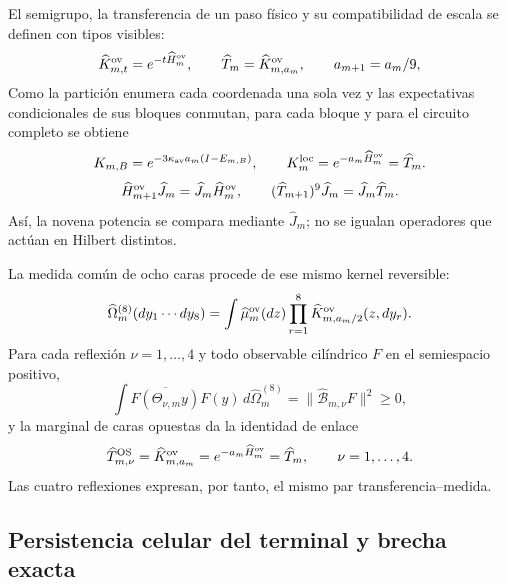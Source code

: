 El semigrupo, la transferencia de un paso físico y su compatibilidad de
escala se definen con tipos visibles:
\begin{equation}\label{eq:realizaciones-ym-semigrupo}
 \widehat K_{m,t}^{\rm ov}=e^{-t\widehat H_m^{\rm ov}},
 \qquad
 \widehat T_m=\widehat K_{m,a_m}^{\rm ov},
 \qquad a_{m+1}=a_m/9,
\end{equation}
Como la partición enumera cada coordenada una sola vez y las expectativas
condicionales de sus bloques conmutan, para cada bloque y para el circuito
completo se obtiene
\begin{equation}\label{eq:realizaciones-ym-circuito-semigrupo}
 K_{m,B}=e^{-3\kappa_{\rm av}a_m(I-E_{m,B})},
 \qquad
 K_m^{\rm loc}=e^{-a_m\widehat H_m^{\rm ov}}=\widehat T_m.
\end{equation}
\begin{equation}\label{eq:realizaciones-ym-semigrupo-entrelazado}
 \widehat H_{m+1}^{\rm ov}\widehat J_m
 =\widehat J_m\widehat H_m^{\rm ov},
 \qquad
 (\widehat T_{m+1})^9\widehat J_m
 =\widehat J_m\widehat T_m.
\end{equation}
Así, la novena potencia se compara mediante \(\widehat J_m\); no se igualan
operadores que actúan en Hilbert distintos.

La medida común de ocho caras procede de ese mismo kernel reversible:
\begin{equation}\label{eq:realizaciones-ym-medida-ocho}
 \widehat\Omega_m^{(8)}(dy_1\cdots dy_8)
 =\int\widehat\mu_m^{\rm ov}(dz)
   \prod_{r=1}^{8}
   \widehat K_{m,a_m/2}^{\rm ov}(z,dy_r).
\end{equation}
Para cada reflexión \(\nu=1,\ldots,4\) y todo observable cilíndrico \(F\)
en el semiespacio positivo,
\begin{equation}\label{eq:realizaciones-ym-os}
 \int\overline{F(\Theta_{\nu,m}y)}F(y)\,
 d\widehat\Omega_m^{(8)}
 =\|\widehat{\mathcal B}_{m,\nu}F\|^2\geq0,
\end{equation}
y la marginal de caras opuestas da la identidad de enlace
\begin{equation}\label{eq:realizaciones-ym-os-transferencia}
 \widehat T_{m,\nu}^{\rm OS}
 =\widehat K_{m,a_m}^{\rm ov}
 =e^{-a_m\widehat H_m^{\rm ov}}
 =\widehat T_m,
 \qquad \nu=1,\ldots,4.
\end{equation}
Las cuatro reflexiones expresan, por tanto, el mismo par
transferencia--medida.

\subsection*{Persistencia celular del terminal y brecha exacta}

